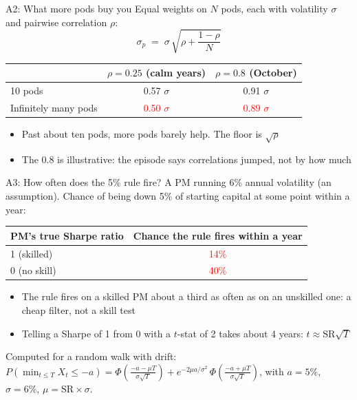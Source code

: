 \documentclass[aspectratio=169,10pt]{beamer}
\begin{document}
\begin{frame}[label=appendix_div]{A2: What more pods buy you}
Equal weights on $N$ pods, each with volatility $\sigma$ and pairwise correlation $\rho$:
\[ \sigma_{p} \;=\; \sigma\,\sqrt{\rho + \frac{1-\rho}{N}} \]
\begin{center}
\begin{tabular}{lcc}
\toprule
 & $\rho = 0.25$ (calm years) & $\rho = 0.8$ (October) \\
\midrule
10 pods & 0.57 $\sigma$ & 0.91 $\sigma$ \\
Infinitely many pods & \textcolor{red}{0.50 $\sigma$} & \textcolor{red}{0.89 $\sigma$} \\
\bottomrule
\end{tabular}
\end{center}
\vskip 6pt
\begin{itemize}
\item Past about ten pods, more pods barely help. The floor is $\sqrt{\rho}$
\item The 0.8 is illustrative: the episode says correlations jumped, not by how much
\end{itemize}
\vskip 5pt
\hfill \hyperlink{q4}{} \quad \hyperlink{q8}{}
\end{frame}

\begin{frame}[label=appendix_stop]{A3: How often does the 5\% rule fire?}
A PM running 6\% annual volatility (an assumption). Chance of being down 5\% of starting capital at some point within a year:
\begin{center}
\begin{tabular}{lc}
\toprule
PM's true Sharpe ratio & Chance the rule fires within a year \\
\midrule
1 (skilled) & \textcolor{red}{14\%} \\
0 (no skill) & \textcolor{red}{40\%} \\
\bottomrule
\end{tabular}
\end{center}
\vskip 6pt
\begin{itemize}
\item The rule fires on a skilled PM about a third as often as on an unskilled one: a cheap filter, not a skill test
\item Telling a Sharpe of 1 from 0 with a $t$-stat of 2 takes about 4 years: $t \approx \text{SR}\sqrt{T}$
\end{itemize}
\vskip 4pt
{\footnotesize Computed for a random walk with drift: $P\!\left(\min_{t\le T} X_t \le -a\right) = \Phi\!\left(\tfrac{-a-\mu T}{\sigma\sqrt{T}}\right) + e^{-2\mu a/\sigma^{2}}\,\Phi\!\left(\tfrac{-a+\mu T}{\sigma\sqrt{T}}\right)$, with $a = 5\%$, $\sigma = 6\%$, $\mu = \text{SR}\times\sigma$.}
\vskip 4pt
\hfill \hyperlink{q6}{}
\end{frame}
\end{document}
